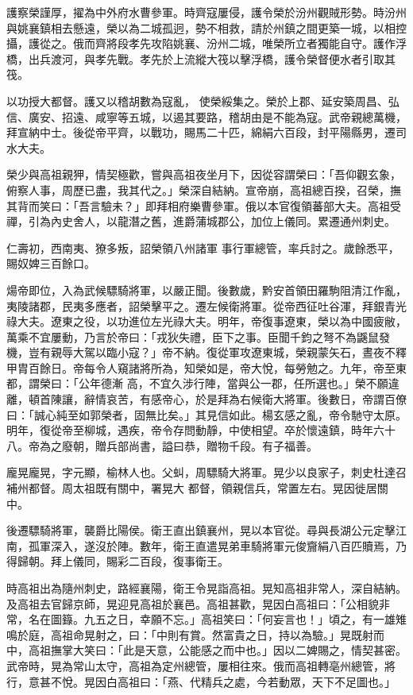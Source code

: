 \begin{pinyinscope}
 護察榮謹厚，擢為中外府水曹參軍。時齊寇屢侵，護令榮於汾州觀賊形勢。時汾州與姚襄鎮相去懸遠，榮以為二城孤迥，勢不相救，請於州鎮之間更築一城，以相控攝，護從之。俄而齊將段孝先攻陷姚襄、汾州二城，唯榮所立者獨能自守。護作浮橋，出兵渡河，與孝先戰。孝先於上流縱大筏以擊浮橋，護令榮督便水者引取其筏。



 以功授大都督。護又以稽胡數為寇亂，
 使榮綏集之。榮於上郡、延安築周昌、弘信、廣安、招遠、咸寧等五城，以遏其要路，稽胡由是不能為寇。武帝親總萬機，拜宣納中士。後從帝平齊，以戰功，賜馬二十匹，綿絹六百段，封平陽縣男，遷司水大夫。



 榮少與高祖親狎，情契極歡，嘗與高祖夜坐月下，因從容謂榮曰：「吾仰觀玄象，俯察人事，周歷已盡，我其代之。」榮深自結納。宣帝崩，高祖總百揆，召榮，撫其背而笑曰：「吾言驗未？」即拜相府樂曹參軍。俄以本官復領蕃部大夫。高祖受禪，引為內史舍人，以龍潛之舊，進爵蒲城郡公，加位上儀同。累遷通州刺史。



 仁壽初，西南夷、獠多叛，詔榮領八州諸軍
 事行軍總管，率兵討之。歲餘悉平，賜奴婢三百餘口。



 煬帝即位，入為武候驃騎將軍，以嚴正聞。後數歲，黔安首領田羅駒阻清江作亂，夷陵諸郡，民夷多應者，詔榮擊平之。遷左候衛將軍。從帝西征吐谷渾，拜銀青光祿大夫。遼東之役，以功進位左光祿大夫。明年，帝復事遼東，榮以為中國疲敝，萬乘不宜屢動，乃言於帝曰：「戎狄失禮，臣下之事。臣聞千鈞之弩不為鼷鼠發機，豈有親辱大駕以臨小寇？」帝不納。復從軍攻遼東城，榮親蒙矢石，晝夜不釋甲胄百餘日。帝每令人窺諸將所為，知榮如是，帝大悅，每勞勉之。九年，帝至東都，謂榮曰：「公年德漸
 高，不宜久涉行陣，當與公一郡，任所選也。」榮不願違離，頓首陳讓，辭情哀苦，有感帝心，於是拜為右候衛大將軍。後數日，帝謂百僚曰：「誠心純至如郭榮者，固無比矣。」其見信如此。楊玄感之亂，帝令馳守太原。明年，復從帝至柳城，遇疾，帝令存問動靜，中使相望。卒於懷遠鎮，時年六十八。帝為之廢朝，贈兵部尚書，謚曰恭，贈物千段。有子福善。



 龐晃龐晃，字元顯，榆林人也。父虯，周驃騎大將軍。晃少以良家子，刺史杜達召補州都督。周太祖既有關中，署晃大
 都督，領親信兵，常置左右。晃因徙居關中。



 後遷驃騎將軍，襲爵比陽侯。衛王直出鎮襄州，晃以本官從。尋與長湖公元定擊江南，孤軍深入，遂沒於陣。數年，衛王直遣晃弟車騎將軍元俊齎絹八百匹贖焉，乃得歸朝。拜上儀同，賜彩二百段，復事衛王。



 時高祖出為隨州刺史，路經襄陽，衛王令晃詣高祖。晃知高祖非常人，深自結納。及高祖去官歸京師，晃迎見高祖於襄邑。高祖甚歡，晃因白高祖曰：「公相貌非常，名在圖籙。九五之日，幸願不忘。」高祖笑曰：「何妄言也！」頃之，有一雄雉鳴於庭，高祖命晃射之，曰：「中則有賞。然富貴之日，持以為驗。」晃既射而
 中，高祖撫掌大笑曰：「此是天意，公能感之而中也。」因以二婢賜之，情契甚密。武帝時，晃為常山太守，高祖為定州總管，屢相往來。俄而高祖轉亳州總管，將行，意甚不悅。晃因白高祖曰：「燕、代精兵之處，今若動眾，天下不足圖也。」




\end{pinyinscope}
